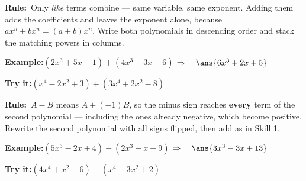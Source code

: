 \documentclass[12pt]{article}
\begin{document}


\begin{formulabox}\textbf{Rule:}\ Only \emph{like} terms combine --- same
variable, same exponent. Adding them adds the coefficients and leaves the
exponent alone, because $ax^n + bx^n = (a+b)x^n$. Write both polynomials in
descending order and stack the matching powers in columns.
\end{formulabox}

\begin{examplebox}\textbf{Example:}\quad $(2x^3 + 5x - 1) + (4x^3 - 3x + 6)$
$\Rightarrow\quad \ans{6x^3+2x+5}$
\end{examplebox}

\begin{tryitbox}\textbf{Try it:}\quad $(x^4 - 2x^2 + 3) + (3x^4 + 2x^2 - 8)$\\[2pt]
\end{tryitbox}


\begin{formulabox}\textbf{Rule:}\ $A - B$ means $A + (-1)B$, so the minus sign
reaches \textbf{every} term of the second polynomial --- including the ones
already negative, which become positive. Rewrite the second polynomial with all
signs flipped, then add as in Skill 1.
\end{formulabox}

\begin{examplebox}\textbf{Example:}\quad $(5x^3 - 2x + 4) - (2x^3 + x - 9)$
$\Rightarrow\quad \ans{3x^3-3x+13}$
\end{examplebox}

\begin{tryitbox}\textbf{Try it:}\quad $(4x^4 + x^2 - 6) - (x^4 - 3x^2 + 2)$\\[2pt]
\end{tryitbox}
\end{document}
